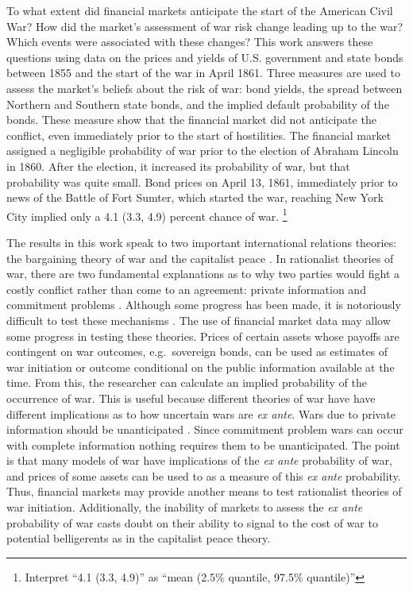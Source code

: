 

\newcommand{\UCn}{Union and Confederacy}
\newcommand{\UCa}{Union and Confederate}


To what extent did financial markets anticipate the start of the American Civil War?
How did the market's assessment of war risk change leading up to the war?
Which events were associated with these changes?
This work answers these questions using data on the prices and yields of U.S. government and state bonds between 1855 and the start of the war in April 1861.
Three measures are used to assess the market's beliefs about the risk of war: bond yields, the spread between Northern and Southern state bonds, and the implied default probability of the bonds.
These measure show that the financial market did not anticipate the conflict, even immediately prior to the start of hostilities.
The financial market assigned a negligible probability of war prior to the election of Abraham Lincoln in 1860.
After the election, it increased its probability of war, but that probability was quite small.
Bond prices on April 13, 1861, immediately prior to news of the Battle of Fort Sumter, which started the war, reaching New York City implied only a 4.1 (3.3, 4.9) percent chance of war.%
\footnote{Interpret ``4.1 (3.3, 4.9)'' as ``mean (2.5\% quantile, 97.5\% quantile)''}

The results in this work speak to two important international relations theories: the bargaining theory of war \parencite{Fearon1995} and the capitalist peace \parencites{GartzkeLiEtAl2001a}{GartzkeLi2003}.
In rationalist theories of war, there are two fundamental explanations as to why two parties would fight a costly conflict rather than come to an agreement: private information and commitment problems \parencites{Fearon1995}{Powell2006}.
Although some progress has been made, it is notoriously difficult to test these mechanisms \parencite{Reiter2003}.
The use of financial market data may allow some progress in testing these theories.
Prices of certain assets whose payoffs are contingent on war outcomes, e.g.\ sovereign bonds, can be used as estimates of war initiation or outcome conditional on the public information available at the time.
From this, the researcher can calculate an implied probability of the occurrence of war.
This is useful because different theories of war have have different implications as to how uncertain wars are \textit{ex ante}.
Wars due to private information should be unanticipated \parencite{Gartzke1999}.
Since commitment problem wars can occur with complete information nothing requires them to be unanticipated.
The point is that many models of war have implications of the \textit{ex ante} probability of war, and prices of some assets can be used to as a measure of this \textit{ex ante} probability.
Thus, financial markets may provide another means to test rationalist theories of war initiation.
Additionally, the inability of markets to assess the \textit{ex ante} probability of war casts doubt on their ability to signal to the cost of war to potential belligerents as in the capitalist peace theory.

